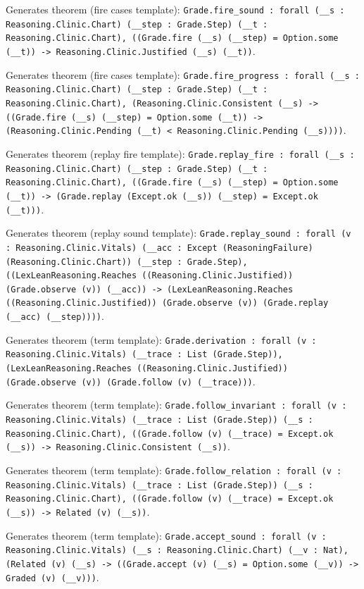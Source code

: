 \documentclass[11pt]{article}
\begin{document}
\noindent Generates theorem (fire cases template): \texttt{Grade.fire\_sound : forall (\_\_s : Reasoning.Clinic.Chart) (\_\_step : Grade.Step) (\_\_t : Reasoning.Clinic.Chart), ((Grade.fire (\_\_s) (\_\_step) = Option.some (\_\_t)) -> Reasoning.Clinic.Justified (\_\_s) (\_\_t))}.\par
\noindent Generates theorem (fire cases template): \texttt{Grade.fire\_progress : forall (\_\_s : Reasoning.Clinic.Chart) (\_\_step : Grade.Step) (\_\_t : Reasoning.Clinic.Chart), (Reasoning.Clinic.Consistent (\_\_s) -> ((Grade.fire (\_\_s) (\_\_step) = Option.some (\_\_t)) -> (Reasoning.Clinic.Pending (\_\_t) < Reasoning.Clinic.Pending (\_\_s))))}.\par
\noindent Generates theorem (replay fire template): \texttt{Grade.replay\_fire : forall (\_\_s : Reasoning.Clinic.Chart) (\_\_step : Grade.Step) (\_\_t : Reasoning.Clinic.Chart), ((Grade.fire (\_\_s) (\_\_step) = Option.some (\_\_t)) -> (Grade.replay (Except.ok (\_\_s)) (\_\_step) = Except.ok (\_\_t)))}.\par
\noindent Generates theorem (replay sound template): \texttt{Grade.replay\_sound : forall (v : Reasoning.Clinic.Vitals) (\_\_acc : Except (ReasoningFailure) (Reasoning.Clinic.Chart)) (\_\_step : Grade.Step), ((LexLeanReasoning.Reaches ((Reasoning.Clinic.Justified)) (Grade.observe (v)) (\_\_acc)) -> (LexLeanReasoning.Reaches ((Reasoning.Clinic.Justified)) (Grade.observe (v)) (Grade.replay (\_\_acc) (\_\_step))))}.\par
\noindent Generates theorem (term template): \texttt{Grade.derivation : forall (v : Reasoning.Clinic.Vitals) (\_\_trace : List (Grade.Step)), (LexLeanReasoning.Reaches ((Reasoning.Clinic.Justified)) (Grade.observe (v)) (Grade.follow (v) (\_\_trace)))}.\par
\noindent Generates theorem (term template): \texttt{Grade.follow\_invariant : forall (v : Reasoning.Clinic.Vitals) (\_\_trace : List (Grade.Step)) (\_\_s : Reasoning.Clinic.Chart), ((Grade.follow (v) (\_\_trace) = Except.ok (\_\_s)) -> Reasoning.Clinic.Consistent (\_\_s))}.\par
\noindent Generates theorem (term template): \texttt{Grade.follow\_relation : forall (v : Reasoning.Clinic.Vitals) (\_\_trace : List (Grade.Step)) (\_\_s : Reasoning.Clinic.Chart), ((Grade.follow (v) (\_\_trace) = Except.ok (\_\_s)) -> Related (v) (\_\_s))}.\par
\noindent Generates theorem (term template): \texttt{Grade.accept\_sound : forall (v : Reasoning.Clinic.Vitals) (\_\_s : Reasoning.Clinic.Chart) (\_\_v : Nat), (Related (v) (\_\_s) -> ((Grade.accept (v) (\_\_s) = Option.some (\_\_v)) -> Graded (v) (\_\_v)))}.\par
\end{document}
